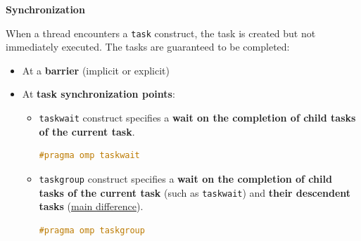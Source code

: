 \begin{flushleft}
    \textcolor{Green3}{ \textbf{Synchronization}}
\end{flushleft}
When a thread encounters a \texttt{task} construct, the task is created but not immediately executed. The tasks are guaranteed to be completed:
\begin{itemize}
    \item At a \textbf{barrier} (implicit or explicit)
    \item At \textbf{task synchronization points}:
    \begin{itemize}
        \item \texttt{taskwait} construct specifies a \textbf{wait on the completion of child tasks of the current task}.
        \begin{openmpbox}
        \begin{lstlisting}[language=C++]
#pragma omp taskwait\end{lstlisting}
        \end{openmpbox}

        \item \texttt{taskgroup} construct specifies a \textbf{wait on the completion of child tasks of the current task} (such as \texttt{taskwait}) and \textbf{their descendent tasks} (\underline{main difference}).
        \begin{openmpbox}
        \begin{lstlisting}[language=C++]
#pragma omp taskgroup\end{lstlisting}
        \end{openmpbox}
    \end{itemize}
\end{itemize}
